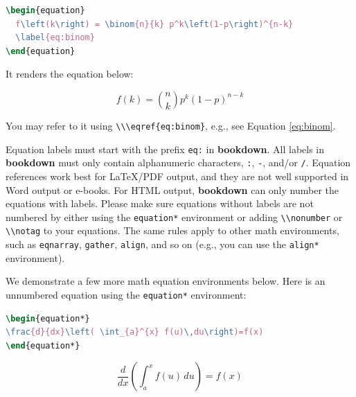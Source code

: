 \documentclass[doctor,openright,twoside]{sjtuthesis}
\newcommand{\passthrough}[1]{#1}
\theoremstyle{plain}
\theoremstyle{definition}
\theoremstyle{remark}
\theoremstyle{ocrenumbox}
\theoremstyle{plain}
\let\BeginKnitrBlock\begin \let\EndKnitrBlock\end
\begin{document}
\begin{lstlisting}[language=TeX]
\begin{equation} 
  f\left(k\right) = \binom{n}{k} p^k\left(1-p\right)^{n-k}
  \label{eq:binom}
\end{equation} 
\end{lstlisting}

It renders the equation below:

\begin{equation}
f\left(k\right)=\binom{n}{k}p^k\left(1-p\right)^{n-k} \label{eq:binom}
\end{equation}

You may refer to it using \passthrough{\lstinline!\\\eqref{eq:binom}!},
e.g., see Equation \eqref{eq:binom}.

\BeginKnitrBlock{rmdcaution}
Equation labels must start with the prefix \passthrough{\lstinline!eq:!}
in \textbf{bookdown}. All labels in \textbf{bookdown} must only contain
alphanumeric characters, \passthrough{\lstinline!:!},
\passthrough{\lstinline!-!}, and/or \passthrough{\lstinline!/!}.
Equation references work best for LaTeX/PDF output, and they are not
well supported in Word output or e-books. For HTML output,
\textbf{bookdown} can only number the equations with labels. Please make
sure equations without labels are not numbered by either using the
\passthrough{\lstinline!equation*!} environment or adding
\passthrough{\lstinline!\\nonumber!} or
\passthrough{\lstinline!\\notag!} to your equations. The same rules
apply to other math environments, such as
\passthrough{\lstinline!eqnarray!}, \passthrough{\lstinline!gather!},
\passthrough{\lstinline!align!}, and so on (e.g., you can use the
\passthrough{\lstinline!align*!} environment).
\EndKnitrBlock{rmdcaution}

We demonstrate a few more math equation environments below. Here is an
unnumbered equation using the \passthrough{\lstinline!equation*!}
environment:

\begin{lstlisting}[language=TeX]
\begin{equation*} 
\frac{d}{dx}\left( \int_{a}^{x} f(u)\,du\right)=f(x)
\end{equation*} 
\end{lstlisting}

\begin{equation*}
\frac{d}{dx}\left( \int_{a}^{x} f(u)\,du\right)=f(x)
\end{equation*}
\end{document}
